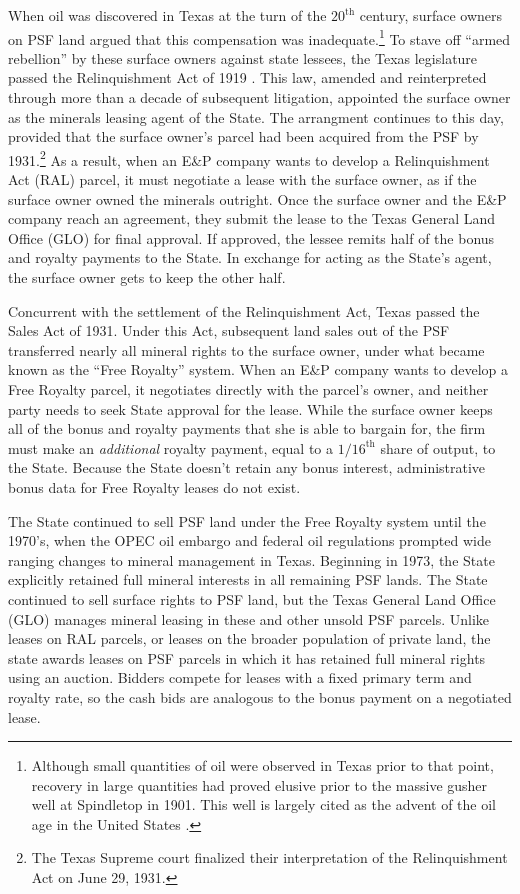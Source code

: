 \documentclass[12pt]{article}
\begin{document}
When oil was discovered in Texas at the turn of the $20^{\text{th}}$ century, surface owners on PSF land argued that this compensation was inadequate.\footnote{Although small quantities of oil were observed in Texas prior to that point, recovery in large quantities had proved elusive prior to the massive gusher well at Spindletop in 1901. This well is largely cited as the advent of the oil age in the United States \citep{yergin_prize_2008}.} To stave off ``armed rebellion'' by these surface owners against state lessees, the Texas legislature passed the Relinquishment Act of 1919 \citep{shields_leasing_1981}. This law, amended and reinterpreted through more than a decade of subsequent litigation, appointed the surface owner as the minerals leasing agent of the State. The arrangment continues to this day, provided that the surface owner's parcel had been acquired from the PSF by 1931.\footnote{The Texas Supreme court finalized their interpretation of the Relinquishment Act on June 29, 1931.} As a result, when an E\&P company wants to develop a Relinquishment Act (RAL) parcel, it must negotiate a lease with the surface owner, as if the surface owner owned the minerals outright. Once the surface owner and the E\&P company reach an agreement, they submit the lease to the Texas General Land Office (GLO) for final approval. If approved, the lessee remits half of the bonus and royalty payments to the State. In exchange for acting as the State's agent, the surface owner gets to keep the other half.

Concurrent with the settlement of the Relinquishment Act, Texas passed the Sales Act of 1931. Under this Act, subsequent land sales out of the PSF transferred nearly all mineral rights to the surface owner, under what became known as the ``Free Royalty'' system.  When an E\&P company wants to develop a Free Royalty parcel, it negotiates directly with the parcel's owner, and neither party needs to seek State approval for the lease.  While the surface owner keeps all of the bonus and royalty payments that she is able to bargain for, the firm must make an \textit{additional} royalty payment, equal to a $1/16^{\text{th}}$ share of output, to the State.  Because the State doesn't retain any bonus interest, administrative bonus data for Free Royalty leases do not exist. 

The State continued to sell PSF land under the Free Royalty system until the 1970's, when the OPEC oil embargo and federal oil regulations prompted wide ranging changes to mineral management in Texas. Beginning in 1973, the State explicitly retained full mineral interests in all remaining PSF lands.  The State continued to sell surface rights to PSF land, but the Texas General Land Office (GLO) manages mineral leasing in these and other unsold PSF parcels. Unlike leases on RAL parcels, or leases on the broader population of private land, the state awards leases on PSF parcels in which it has retained full mineral rights using an auction. Bidders compete for leases with a fixed primary term and royalty rate, so the cash bids are analogous to the bonus payment on a negotiated lease. 
\end{document}
